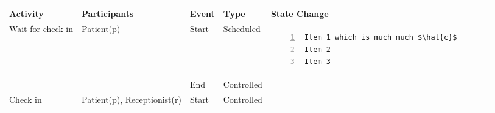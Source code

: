\setlength{\lastcol}{8cm}
\begin{tabular}{@{}>{\raggedright\arraybackslash}p{1.5cm}>{\raggedright\arraybackslash}p{2cm}>{\raggedright\arraybackslash}p{0.9cm}>{\raggedright\arraybackslash}p{1.6cm}>{\raggedright\arraybackslash}p{\lastcol}@{}}
  \toprule
  Activity             & Participants        & Event & Type & State Change \\ \midrule 
  Wait for check in & Patient(p) & Start & Scheduled &
  \begin{Verbatim}[numbers=left]
Item 1 which is much much $\hat{c}$
Item 2
Item 3
  \end{Verbatim}
  \\ \cmidrule{3-5}
  & & End & Controlled & \\ \midrule
  Check in & Patient(p), Receptionist(r) & Start & Controlled &
  \end{tabular}